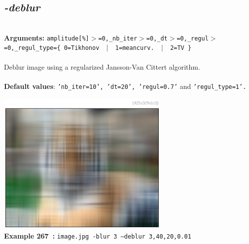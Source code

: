 \documentclass[a4paper,11pt,twoside]{book}
\begin{document}
\subsection{\emph{-deblur} }\vspace*{-0.5em}
~\\\textbf{Arguments: } 
{\small \texttt{amplitude[\%]$>$=0,\_nb\_iter$>$=0,\_dt$>$=0,\_regul$>$=0,\_regul\_type=\{ 0=Tikhonov ~$|$~ 1=meancurv. ~$|$~ 2=TV \}}}\\~\\
Deblur image using a regularized Jansson-Van Cittert algorithm.
~\\~\\\textbf{Default values}: {\small \texttt{'nb\_iter=10', 'dt=20', 'regul=0.7'} and \texttt{'regul\_type=1'.}}
\begin{center}\includegraphics[keepaspectratio=true,height=7cm,width=\textwidth]{img/gmic_def267.jpg}\\
{\footnotesize \textbf{Example 267~:} \texttt{image.jpg -blur 3 --deblur 3,40,20,0.01}}
\end{center}
\end{document}
